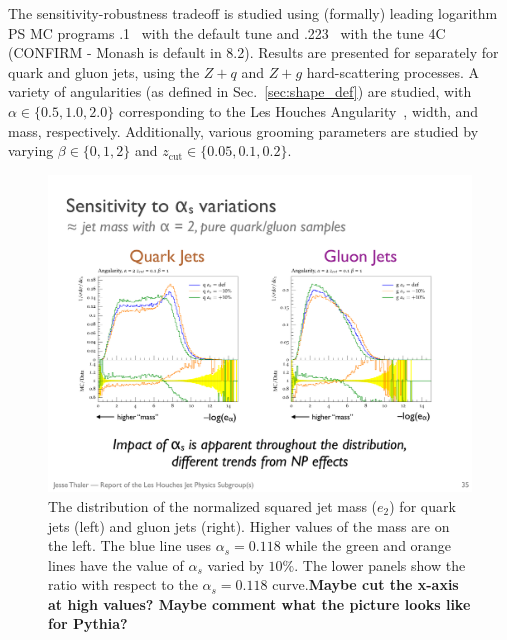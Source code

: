 The sensitivity-robustness tradeoff is studied using (formally) leading logarithm PS MC programs \herwig.1~\cite{Bellm:2015jjp,Reichelt:2017hts} with the default tune and \pythia.223~\cite{Sjostrand:2006za,Sjostrand:2014zea} with the tune 4C (CONFIRM - Monash is default in 8.2).  Results are presented for separately for quark and gluon jets, using the $Z+q$ and $Z+g$ hard-scattering processes.  A variety of angularities (as defined in Sec.~\ref{sec:shape_def}) are studied, with $\alpha\in\{0.5,1.0, 2.0\}$ corresponding to the Les Houches Angularity~\cite{Gras:2017jty}, width, and mass, respectively.  Additionally, various grooming parameters are studied by varying $\beta\in\{0,1,2\}$ and $z_\text{cut}\in \{0.05,0.1,0.2\}$.  

\begin{figure}[h!]
\begin{center}
\includegraphics[width = 0.99\columnwidth]{figures/sensitivity.pdf}
\end{center}
\caption{The distribution of the normalized squared jet mass ($e_2$) for quark jets (left) and gluon jets (right).  Higher values of the mass are on the left.  The blue line uses $\alpha_s=0.118$ while the green and orange lines have the value of $\alpha_s$ varied by $10\%$.  The lower panels show the ratio with respect to the $\alpha_s=0.118$ curve.\textbf{Maybe cut the x-axis at high values?  Maybe comment what the picture looks like for Pythia?}}
\label{fig:sensitivity}
\end{figure}

